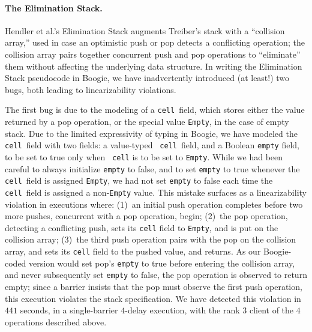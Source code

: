 \paragraph{\bf The Elimination Stack.}

Hendler et al.'s Elimination Stack \cite{conf/spaa/HendlerSY04} augments Treiber's stack with a ``collision
array,'' used in case an optimistic push or pop detects a conflicting
operation; the collision array pairs together concurrent push and pop
operations to ``eliminate'' them without affecting the underlying data
structure. In writing the Elimination Stack pseudocode in Boogie, we have
inadvertently introduced (at least!) two bugs, both leading to linearizability
violations.

The first bug is due to the modeling of a {\tt cell}~field, which stores either
the value returned by a pop operation, or the special value {\tt Empty}, in the
case of empty stack. Due to the limited expressivity of typing in Boogie, we
have modeled the {\tt cell}~field with two fields: a value-typed {\tt
cell}~field, and a Boolean {\tt empty} field, to be set to true only when {\tt
cell} is to be set to {\tt Empty}. While we had been careful to always
initialize {\tt empty} to false, and to set {\tt empty} to true whenever the
{\tt cell}~field is assigned {\tt Empty}, we had not set {\tt empty} to false
each time the {\tt cell}~field is assigned a non-{\tt Empty} value. This
mistake surfaces as a linearizability violation in executions where: (1)~an
initial push operation completes before two more pushes, concurrent with a pop
operation, begin; (2)~the pop operation, detecting a conflicting push, sets its
{\tt cell} field to {\tt Empty}, and is put on the collision array; (3)~the
third push operation pairs with the pop on the collision array, and sets its
{\tt cell} field to the pushed value, and returns. As our Boogie-coded
version would set pop's {\tt empty} to true before entering the collision
array, and never subsequently set {\tt empty} to false, the pop operation is
observed to return empty; since a barrier insists that the pop must observe the
first push operation, this execution violates the stack specification. We have
detected this violation in $441$ seconds, in a single-barrier $4$-delay
execution, with the rank $3$ client of the $4$ operations described above.

